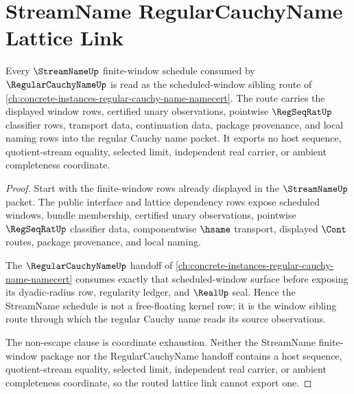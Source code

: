 \section{StreamName RegularCauchyName Lattice Link}
\label{sec:streamname-regularcauchyname-lattice-link}

\begin{theorem}
\label{thm:streamname-regularcauchyname-lattice-link}
Every $\StreamNameUp$ finite-window schedule consumed by $\RegularCauchyNameUp$ is read as the scheduled-window sibling route of \autoref{ch:concrete-instances-regular-cauchy-name-namecert}. The route carries the displayed window rows, certified unary observations, pointwise $\RegSeqRatUp$ classifier rows, transport data, continuation data, package provenance, and local naming rows into the regular Cauchy name packet. It exports no host sequence, quotient-stream equality, selected limit, independent real carrier, or ambient completeness coordinate.
\end{theorem}
\begin{proof}
Start with the finite-window rows already displayed in the $\StreamNameUp$ packet. The public interface and lattice dependency rows expose scheduled windows, bundle membership, certified unary observations, pointwise $\RegSeqRatUp$ classifier data, componentwise $\hsame$ transport, displayed $\Cont$ routes, package provenance, and local naming.

The $\RegularCauchyNameUp$ handoff of \autoref{ch:concrete-instances-regular-cauchy-name-namecert} consumes exactly that scheduled-window surface before exposing its dyadic-radius row, regularity ledger, and $\RealUp$ seal. Hence the StreamName schedule is not a free-floating kernel row; it is the window sibling route through which the regular Cauchy name reads its source observations.

The non-escape clause is coordinate exhaustion. Neither the StreamName finite-window package nor the RegularCauchyName handoff contains a host sequence, quotient-stream equality, selected limit, independent real carrier, or ambient completeness coordinate, so the routed lattice link cannot export one.
\end{proof}

